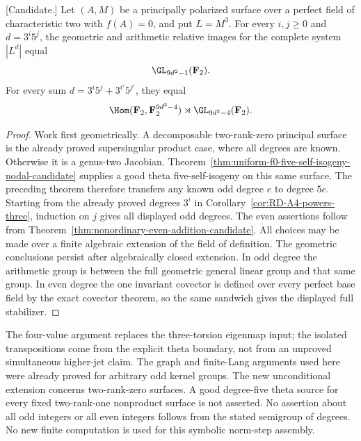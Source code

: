 \begin{corollary}
\label{cor:f0-three-five-degree-groups-candidate}
\textup{[Candidate.]}
Let $(A,M)$ be a principally polarized surface over a perfect field
of characteristic two with $f(A)=0$, and put $L=M^3$.
For every $i,j\ge0$ and $d=3^i5^j$, the geometric and arithmetic
relative images for the complete system $|L^d|$ equal
\[
                           \GL_{9d^2-1}(\mathbf F_2).
\]
For every sum $d=3^i5^j+3^{i'}5^{j'}$, they equal
\[
 \Hom(\mathbf F_2,\mathbf F_2^{9d^2-4})
                          \rtimes\GL_{9d^2-4}(\mathbf F_2).
\]
\end{corollary}
\begin{proof}
Work first geometrically. A decomposable two-rank-zero principal
surface is the already proved supersingular product case, where
all degrees are known. Otherwise it is a genus-two Jacobian.
Theorem~\ref{thm:uniform-f0-five-self-isogeny-nodal-candidate}
supplies a good theta five-self-isogeny on this same surface.
The preceding theorem therefore transfers any known odd degree
$e$ to degree $5e$. Starting from the already proved degrees
$3^i$ in Corollary~\ref{cor:RD-A4-powers-three}, induction on $j$
gives all displayed odd degrees. The even assertions follow from
Theorem~\ref{thm:nonordinary-even-addition-candidate}.
All choices may be made over a finite algebraic extension of the
field of definition. The geometric conclusions persist after
algebraically closed extension. In odd degree the arithmetic
group is between the full geometric general linear group and
that same group. In even degree the one invariant covector is
defined over every perfect base field by the exact covector
theorem, so the same sandwich gives the displayed full stabilizer.
\end{proof}

\begin{remark}
\label{rem:good-theta-norm-transfer-scope-candidate}
The four-value argument replaces the three-torsion eigenmap input;
the isolated transpositions come from the explicit theta boundary,
not from an unproved simultaneous higher-jet claim. The graph and
finite-Lang arguments used here were already proved for arbitrary
odd kernel groups. The new unconditional extension concerns
two-rank-zero surfaces. A good degree-five theta source for every
fixed two-rank-one nonproduct surface is not asserted. No assertion
about all odd integers or all even integers follows from the stated
semigroup of degrees. No new finite computation is used for this
symbolic norm-step assembly.
\end{remark}
